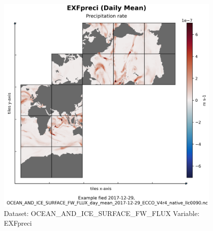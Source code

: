 \begin{figure}[H]
\centering
\includegraphics[width=\textwidth]{../images/plots/native_plots/Ocean_and_Sea-Ice_Surface_Freshwater_Fluxes/EXFpreci.png}
\caption{Dataset: OCEAN\_AND\_ICE\_SURFACE\_FW\_FLUX Variable: EXFpreci}
\label{tab:table-OCEAN_AND_ICE_SURFACE_FW_FLUX_EXFpreci-Plot}
\end{figure}
\pagebreak
